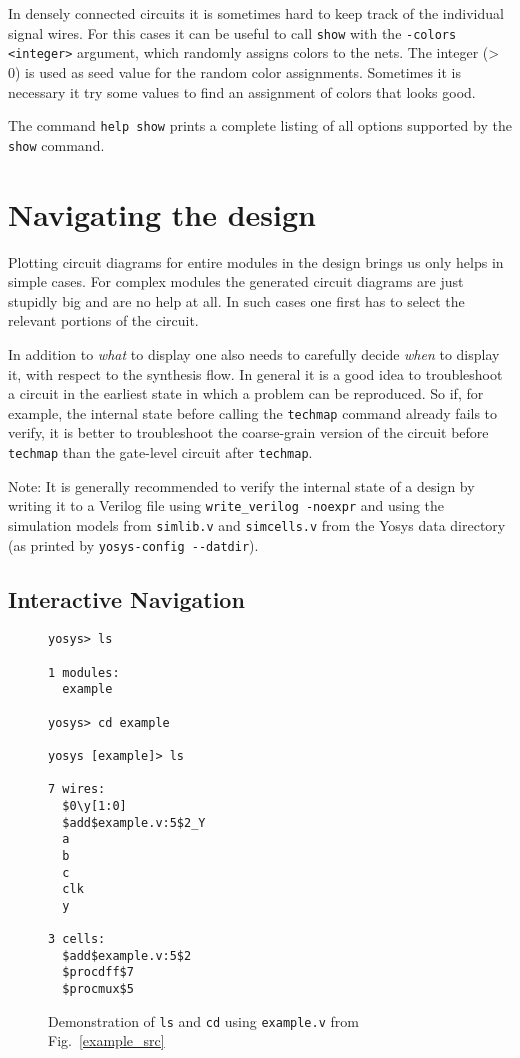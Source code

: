 \documentclass[9pt,technote,a4paper]{IEEEtran}
\begin{document}
In densely connected circuits it is sometimes hard to keep track of the
individual signal wires. For this cases it can be useful to call {\tt show}
with the {\tt -colors <integer>} argument, which randomly assigns colors to the
nets.  The integer (> 0) is used as seed value for the random color
assignments. Sometimes it is necessary it try some values to find an assignment
of colors that looks good.

The command {\tt help show} prints a complete listing of all options supported
by the {\tt show} command.

\section{Navigating the design}
\label{navigate}

Plotting circuit diagrams for entire modules in the design brings us only helps
in simple cases. For complex modules the generated circuit diagrams are just stupidly big
and are no help at all. In such cases one first has to select the relevant
portions of the circuit.

In addition to {\it what\/} to display one also needs to carefully decide
{\it when\/} to display it, with respect to the synthesis flow. In general
it is a good idea to troubleshoot a circuit in the earliest state in which
a problem can be reproduced. So if, for example, the internal state before calling
the {\tt techmap} command already fails to verify, it is better to troubleshoot
the coarse-grain version of the circuit before {\tt techmap} than the gate-level
circuit after {\tt techmap}.

\medskip

Note: It is generally recommended to verify the internal state of a design by
writing it to a Verilog file using {\tt write\_verilog -noexpr} and using the
simulation models from {\tt simlib.v} and {\tt simcells.v} from the Yosys data
directory (as printed by {\tt yosys-config -{}-datdir}).

\subsection{Interactive Navigation}

\begin{figure}
\begin{lstlisting}
yosys> ls

1 modules:
  example

yosys> cd example

yosys [example]> ls

7 wires:
  $0\y[1:0]
  $add$example.v:5$2_Y
  a
  b
  c
  clk
  y

3 cells:
  $add$example.v:5$2
  $procdff$7
  $procmux$5
\end{lstlisting}
\caption{Demonstration of {\tt ls} and {\tt cd} using {\tt example.v} from Fig.~\ref{example_src}}
\label{lscd}
\end{figure}
\end{document}
